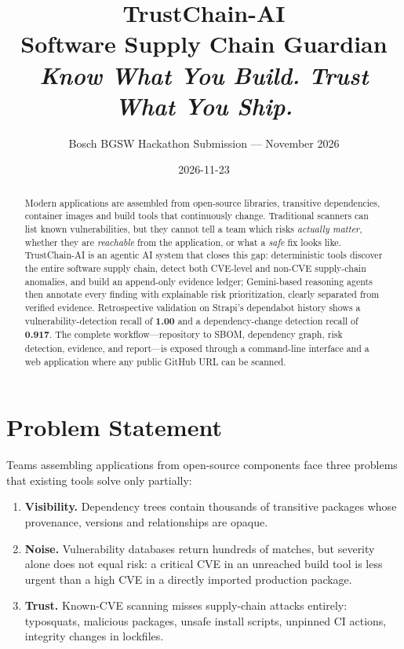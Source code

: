 \documentclass[11pt,a4paper]{article}
\title{\textbf{TrustChain-AI}\\[4pt]
\large Software Supply Chain Guardian\\[2pt]
\textit{Know What You Build. Trust What You Ship.}}
\author{Bosch BGSW Hackathon Submission --- November 2026}
\date{2026-11-23}
\begin{document}
\maketitle

\begin{abstract}
Modern applications are assembled from open-source libraries, transitive dependencies,
container images and build tools that continuously change. Traditional scanners can list
known vulnerabilities, but they cannot tell a team which risks \emph{actually matter},
whether they are \emph{reachable} from the application, or what a \emph{safe} fix looks
like. TrustChain-AI is an agentic AI system that closes this gap: deterministic tools
discover the entire software supply chain, detect both CVE-level and non-CVE
supply-chain anomalies, and build an append-only evidence ledger; Gemini-based reasoning
agents then annotate every finding with explainable risk prioritization, clearly
separated from verified evidence. Retrospective validation on Strapi's dependabot
history shows a vulnerability-detection recall of \textbf{1.00} and a dependency-change
detection recall of \textbf{0.917}. The complete workflow---repository to SBOM,
dependency graph, risk detection, evidence, and report---is exposed through a
command-line interface and a web application where any public GitHub URL can be scanned.
\end{abstract}

\tableofcontents
\vspace{1em}

\section{Problem Statement}

Teams assembling applications from open-source components face three problems that
existing tools solve only partially:

\begin{enumerate}[itemsep=2pt]
  \item \textbf{Visibility.} Dependency trees contain thousands of transitive packages
        whose provenance, versions and relationships are opaque.
  \item \textbf{Noise.} Vulnerability databases return hundreds of matches, but severity
        alone does not equal risk: a critical CVE in an unreached build tool is less
        urgent than a high CVE in a directly imported production package.
  \item \textbf{Trust.} Known-CVE scanning misses supply-chain attacks entirely:
        typosquats, malicious packages, unsafe install scripts, unpinned CI actions,
        integrity changes in lockfiles.
\end{enumerate}
\end{document}
